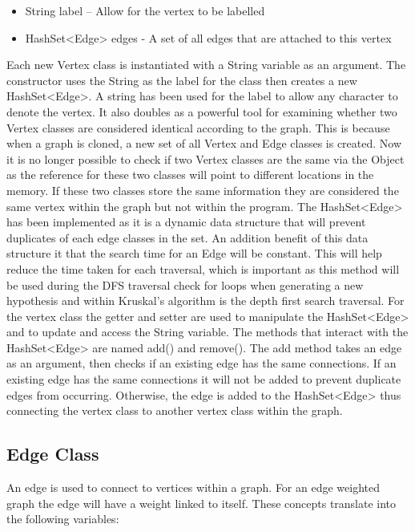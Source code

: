 \documentclass{AISB2008}
\begin{document}
{\begin{itemize}
\item String label – Allow for the vertex to be labelled
\item HashSet<Edge> edges - A set of all edges that are attached to this vertex
\end{itemize}
Each new Vertex class is instantiated with a String variable as an argument. The constructor uses the String as the label for the class then creates a new HashSet<Edge>. A string has been used for the label to allow any character to denote the vertex. It also doubles as a powerful tool for examining whether two Vertex classes are considered identical according to the graph. This is because when a graph is cloned, a new set of all Vertex and Edge classes is created. Now it is no longer possible to check if two Vertex classes are the same via the Object as the reference for these two classes will point to different locations in the memory. If these two classes store the same information they are considered the same vertex within the graph but not within the program.
The HashSet<Edge> has been implemented as it is a dynamic data structure that will prevent duplicates of each edge classes in the set. An addition benefit of this data structure it that the search time for an Edge will be constant. This will help reduce the time taken for each traversal, which is important as this method will be used during the DFS traversal check for loops when generating a new hypothesis and within Kruskal’s algorithm is the depth first search traversal.
For the vertex class the getter and setter are used to manipulate the HashSet<Edge> and to update and access the String variable. The methods that interact with the HashSet<Edge> are named add() and remove(). The add method takes an edge as an argument, then checks if an existing edge has the same connections. If an existing edge has the same connections it will not be added to prevent duplicate edges from occurring. Otherwise, the edge is added to the HashSet<Edge> thus connecting the vertex class to another vertex class within the graph.


\subsection{Edge Class}

An edge is used to connect to vertices within a graph. For an edge weighted graph the edge will have a weight linked to itself. These concepts translate into the following variables:

}
\end{document}
